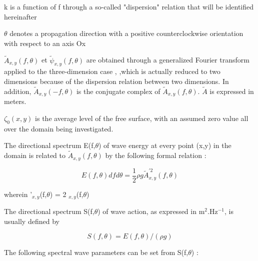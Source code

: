  k is a function of f through a so-called "dispersion" relation that will be identified hereinafter

 $\theta$ denotes a propagation direction with a positive counterclockwise orientation with respect to an axis Ox

 $\tilde{A}_{x,y}(f,\theta)$ et $\tilde{\psi}_{x,y}(f,\theta)$ are obtained
 through a generalized Fourier transform applied to the three-dimension case
 \cite{Hamm1995}, ,which is actually reduced to two dimensions because of the
 dispersion relation between two dimensions. In addition,
 $\tilde{A}_{x,y}(-f,\theta)$ is the conjugate complex of
 $\tilde{A}_{x,y}(f,\theta)$.
 $\tilde{A}$ is expressed in meters.

 $\zeta_{0}(x,y)$ is the average level of the free surface, with an assumed zero value all over the domain being investigated.

The directional spectrum E(f,$\theta$) of wave energy at every point
(x,y) in the domain is related to $\tilde{A}_{x,y}(f,\theta)$ by the
following formal relation :

\begin{equation}
  E(f, \theta)dfd\theta = \frac{1}{2}\rho g\tilde{A}_{x,y}^{'2}(f, \theta)
\end{equation}

wherein  '${}_{x,y}$(f,$\theta$) = 2 ${}_{x,y}$(f,$\theta$)

The directional spectrum S(f,$\theta$) of wave action, as expressed in m${}^{2}$.Hz${}^{-1}$, is usually defined by

\begin{equation}
S(f,\theta)=E(f,\theta)/(\rho g)
\end{equation}


The following spectral wave parameters can be set from S(f,$\theta$) :

